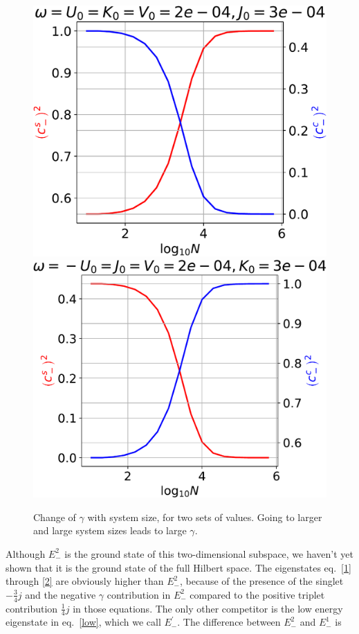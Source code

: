 \documentclass[12pt,twoside]{article}
\numberwithin{equation}{section}
\begin{document}
\begin{figure}[http]
	\centering
	\includegraphics[scale=0.5]{../figures/gamma_q1.pdf}\\
	\includegraphics[scale=0.5]{../figures/gamma_q3.pdf}
	\caption{Change of \(\gamma\) with system size, for two sets of values. Going to larger and large system sizes leads to large \(\gamma\).}
	\label{fig:}
\end{figure}
Although \(E^2_-\) is the ground state of this two-dimensional subspace, we haven't yet shown that it is the ground state of the full Hilbert space. The eigenstates eq.~\ref{1} through \ref{2} are obviously higher than \(E_-^2\), because of the presence of the singlet \(- \frac{3}{4}j\) and the negative \(\gamma\) contribution in \(E_-^2\) compared to the positive triplet contribution \( \frac{1}{4}j\) in those equations. The only other competitor is the low energy eigenstate in eq.~\ref{low}, which we call \(E_-^\prime\). The difference between \(E_-^2\) and \(E_-^1\) is
\end{document}
